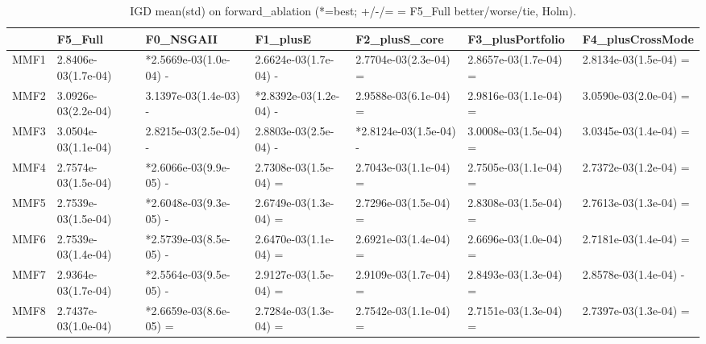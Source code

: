 \begin{table}[t]
\centering
\caption{IGD mean(std) on forward_ablation (*=best; +/-/= = F5_Full better/worse/tie, Holm).}
\label{tab:forward_ablation_IGD}
\begin{tabular}{lllllll}
\toprule
 & F5\_Full & F0\_NSGAII & F1\_plusE & F2\_plusS\_core & F3\_plusPortfolio & F4\_plusCrossMode \\
\midrule
MMF1 & 2.8406e-03(1.7e-04) & *2.5669e-03(1.0e-04) - & 2.6624e-03(1.7e-04) - & 2.7704e-03(2.3e-04) = & 2.8657e-03(1.7e-04) = & 2.8134e-03(1.5e-04) = \\
MMF2 & 3.0926e-03(2.2e-04) & 3.1397e-03(1.4e-03) - & *2.8392e-03(1.2e-04) - & 2.9588e-03(6.1e-04) = & 2.9816e-03(1.1e-04) = & 3.0590e-03(2.0e-04) = \\
MMF3 & 3.0504e-03(1.1e-04) & 2.8215e-03(2.5e-04) - & 2.8803e-03(2.5e-04) - & *2.8124e-03(1.5e-04) - & 3.0008e-03(1.5e-04) = & 3.0345e-03(1.4e-04) = \\
MMF4 & 2.7574e-03(1.5e-04) & *2.6066e-03(9.9e-05) - & 2.7308e-03(1.5e-04) = & 2.7043e-03(1.1e-04) = & 2.7505e-03(1.1e-04) = & 2.7372e-03(1.2e-04) = \\
MMF5 & 2.7539e-03(1.5e-04) & *2.6048e-03(9.3e-05) - & 2.6749e-03(1.3e-04) = & 2.7296e-03(1.5e-04) = & 2.8308e-03(1.5e-04) = & 2.7613e-03(1.3e-04) = \\
MMF6 & 2.7539e-03(1.4e-04) & *2.5739e-03(8.5e-05) - & 2.6470e-03(1.1e-04) = & 2.6921e-03(1.4e-04) = & 2.6696e-03(1.0e-04) = & 2.7181e-03(1.4e-04) = \\
MMF7 & 2.9364e-03(1.7e-04) & *2.5564e-03(9.5e-05) - & 2.9127e-03(1.5e-04) = & 2.9109e-03(1.7e-04) = & 2.8493e-03(1.3e-04) = & 2.8578e-03(1.4e-04) - \\
MMF8 & 2.7437e-03(1.0e-04) & *2.6659e-03(8.6e-05) = & 2.7284e-03(1.3e-04) = & 2.7542e-03(1.1e-04) = & 2.7151e-03(1.3e-04) = & 2.7397e-03(1.3e-04) = \\
\bottomrule
\end{tabular}
\end{table}
